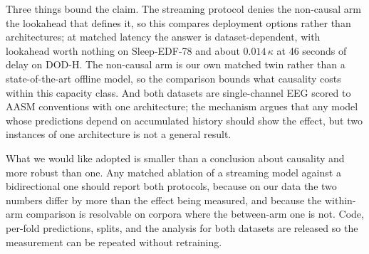 \documentclass[conference]{IEEEtran}
\begin{document}
Three things bound the claim. The streaming protocol denies the non-causal arm the lookahead that
defines it, so this compares deployment options rather than architectures; at matched latency the
answer is dataset-dependent, with lookahead worth nothing on Sleep-EDF-78 and about $0.014\,\kappa$
at 46 seconds of delay on DOD-H. The non-causal arm is our own matched twin rather than a
state-of-the-art offline model, so the comparison bounds what causality costs within this capacity
class. And both datasets are single-channel EEG scored to AASM conventions with one architecture;
the mechanism argues that any model whose predictions depend on accumulated history should show the
effect, but two instances of one architecture is not a general result.

What we would like adopted is smaller than a conclusion about causality and more robust than one.
Any matched ablation of a streaming model against a bidirectional one should report both protocols,
because on our data the two numbers differ by more than the effect being measured, and because the
within-arm comparison is resolvable on corpora where the between-arm one is not. Code, per-fold
predictions, splits, and the analysis for both datasets are released so the measurement can be
repeated without retraining.
\end{document}
